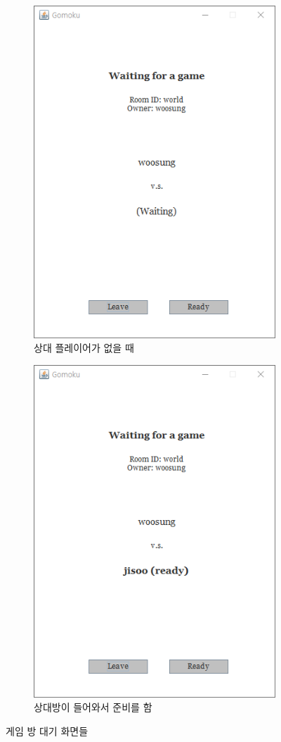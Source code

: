\documentclass[a4paper, 10pt]{article}
\begin{document}
\begin{figure}[h]
  \centering
  \begin{subfigure}{.3\textwidth}
    \centering
    \includegraphics[width=.8\linewidth]{resource/waiting}
    \caption{상대 플레이어가 없을 때}
    \label{fig:waiting}
  \end{subfigure}
  \begin{subfigure}{.3\textwidth}
    \centering
    \includegraphics[width=.8\linewidth]{resource/room}
    \caption{상대방이 들어와서 준비를 함}
    \label{fig:room}
  \end{subfigure}
  \caption{게임 방 대기 화면들}
\end{figure}
\newpage
\end{document}
